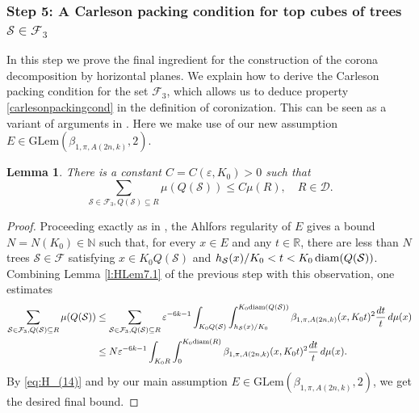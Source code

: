 \documentclass[12pt]{amsart}
\newcommand{\R}{\mathbb R}
\newcommand{\diam}{{\rm diam}}
\newcommand{\N}{\mathbb N}
\numberwithin{equation}{section}
\theoremstyle{plain}
\newtheorem{lemma}[theorem]{Lemma}
\theoremstyle{definition}
\theoremstyle{remark}
\begin{document}
\subsubsection{Step 5: A Carleson packing condition for top cubes of trees $\mathcal S\in \mathcal F_3$}\label{sss:Step5}
In this step we prove the final ingredient for the construction of the corona decomposition by horizontal planes. We explain how to derive the Carleson packing condition for the set $\mathcal F_3$, which allows us to deduce property \eqref{carlesonpackingcond} in the definition of coronization.
This can be seen as a variant of arguments in \cite[Section 12]{David1}.
Here we make use of our new assumption $E \in \mathrm{GLem}(\beta_{1,\pi,A(2n,k)}, 2)$. 
\begin{lemma}\label{l:HahLem8.1}
There is a constant $C=C(\varepsilon, K_0)>0$ such that
\begin{displaymath}
    \sum_{\mathcal{S}\in \mathcal{F}_3,Q(\mathcal{S})\subseteq R}\mu(Q(\mathcal{S}))\leq C \mu(R),\quad R\in \mathcal{D}.
\end{displaymath}
\end{lemma}
\begin{proof}
Proceeding exactly as in \cite[Lemma 8.1]{Hahlomaa}, the Ahlfors regularity of $E$ gives a bound $N=N(K_0)\in\N$ such that, for every $x\in E$ and any $t\in\R $, there are less than $N$ trees $\mathcal S\in\mathcal F$ satisfying $x\in K_0 Q(\mathcal S)$ and $h_\mathcal S(x)/K_0<t<K_0\,\diam(Q(\mathcal S))$. Combining Lemma \ref{l:HLem7.1} of the previous step with this observation, one estimates
\[\begin{split}\sum_{\mathcal{S}\in \mathcal{F}_3,Q(\mathcal{S})\subseteq R}\mu(Q(\mathcal{S}))&\leq\sum_{\mathcal{S}\in \mathcal{F}_3,Q(\mathcal{S})\subseteq R}{\varepsilon}^{-6k-1}  \int_{{K_0}Q(\mathcal{S})}\int_{h_{\mathcal{S}}(x)/{K_0}}^{{K_0}\mathrm{diam}(Q(\mathcal{S}))}\beta_{1,\pi,A(2n,k)}(x,{K_0}t)^2\frac{dt}{t}\,d\mu(x)\\ &\leq N\varepsilon^{-6k-1}\int_{K_0R}\int_{0}^{K_0\diam(R)}\beta_{1,\pi,A(2n,k)}(x,{K_0}t)^2\frac{dt}{t}\,d\mu(x).\end{split}\]
By \eqref{eq:H_(14)} and by our main assumption $E \in \mathrm{GLem}(\beta_{1,\pi,A(2n,k)}, 2)$, we get the desired final bound.
\end{proof}
\printbibliography
\end{document}
